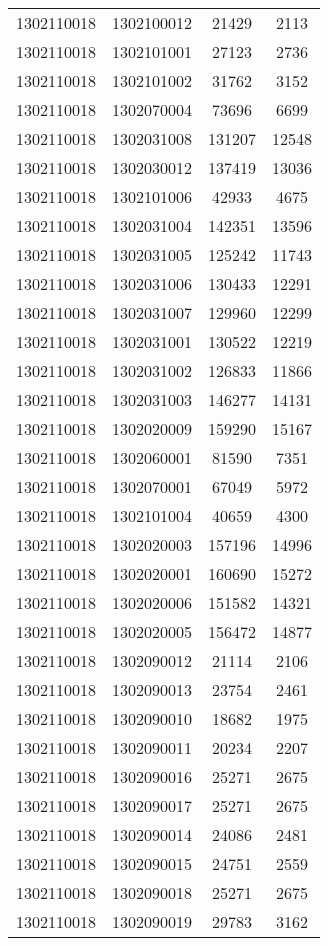 \begin{longtable}{llcc}
1302110018 & 1302100012 & 21429 & 2113\\
1302110018 & 1302101001 & 27123 & 2736\\
1302110018 & 1302101002 & 31762 & 3152\\
1302110018 & 1302070004 & 73696 & 6699\\
1302110018 & 1302031008 & 131207 & 12548\\
1302110018 & 1302030012 & 137419 & 13036\\
1302110018 & 1302101006 & 42933 & 4675\\
1302110018 & 1302031004 & 142351 & 13596\\
1302110018 & 1302031005 & 125242 & 11743\\
1302110018 & 1302031006 & 130433 & 12291\\
1302110018 & 1302031007 & 129960 & 12299\\
1302110018 & 1302031001 & 130522 & 12219\\
1302110018 & 1302031002 & 126833 & 11866\\
1302110018 & 1302031003 & 146277 & 14131\\
1302110018 & 1302020009 & 159290 & 15167\\
1302110018 & 1302060001 & 81590 & 7351\\
1302110018 & 1302070001 & 67049 & 5972\\
1302110018 & 1302101004 & 40659 & 4300\\
1302110018 & 1302020003 & 157196 & 14996\\
1302110018 & 1302020001 & 160690 & 15272\\
1302110018 & 1302020006 & 151582 & 14321\\
1302110018 & 1302020005 & 156472 & 14877\\
1302110018 & 1302090012 & 21114 & 2106\\
1302110018 & 1302090013 & 23754 & 2461\\
1302110018 & 1302090010 & 18682 & 1975\\
1302110018 & 1302090011 & 20234 & 2207\\
1302110018 & 1302090016 & 25271 & 2675\\
1302110018 & 1302090017 & 25271 & 2675\\
1302110018 & 1302090014 & 24086 & 2481\\
1302110018 & 1302090015 & 24751 & 2559\\
1302110018 & 1302090018 & 25271 & 2675\\
1302110018 & 1302090019 & 29783 & 3162\\

\end{longtable}
